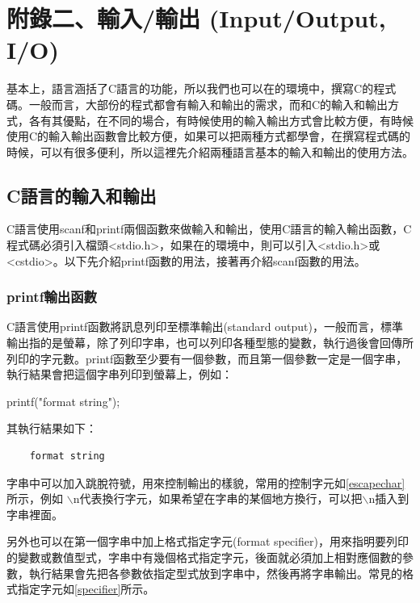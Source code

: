 \section{附錄二、輸入/輸出 (Input/Output, I/O)}
基本上，\cc{}語言涵括了C語言的功能，所以我們也可以在\cc{}的環境中，撰寫C的程式碼。一般而言，大部份的程式都會有輸入和輸出的需求，而\cc{}和C的輸入和輸出方式，各有其優點，在不同的場合，有時候使用\cc{}的輸入輸出方式會比較方便，有時候使用C的輸入輸出函數會比較方便，如果可以把兩種方式都學會，在撰寫程式碼的時候，可以有很多便利，所以這裡先介紹兩種語言基本的輸入和輸出的使用方法。

\subsection{C語言的輸入和輸出}
C語言使用scanf和printf兩個函數來做輸入和輸出，使用C語言的輸入輸出函數，C程式碼必須引入檔頭<stdio.h>，如果在\cc{}的環境中，則可以引入<stdio.h>或<cstdio>。以下先介紹printf函數的用法，接著再介紹scanf函數的用法。

\subsubsection {printf輸出函數}
C語言使用printf函數將訊息列印至標準輸出(standard output)，一般而言，標準輸出指的是螢幕，除了列印字串，也可以列印各種型態的變數，執行過後會回傳所列印的字元數。printf函數至少要有一個參數，而且第一個參數一定是一個字串，執行結果會把這個字串列印到螢幕上，例如：
\begin{inside}
	printf("format string");
\end{inside}
其執行結果如下：
\begin{Verbatim}
    format string
\end{Verbatim}
字串中可以加入跳脫符號，用來控制輸出的樣貌，常用的控制字元如\autoref{escapechar}所示，例如
$\backslash$n代表換行字元，如果希望在字串的某個地方換行，可以把$\backslash$n插入到字串裡面。

另外也可以在第一個字串中加上格式指定字元(format specifier)，用來指明要列印的變數或數值型式，字串中有幾個格式指定字元，後面就必須加上相對應個數的參數，執行結果會先把各參數依指定型式放到字串中，然後再將字串輸出。常見的格式指定字元如\autoref{specifier}所示。

